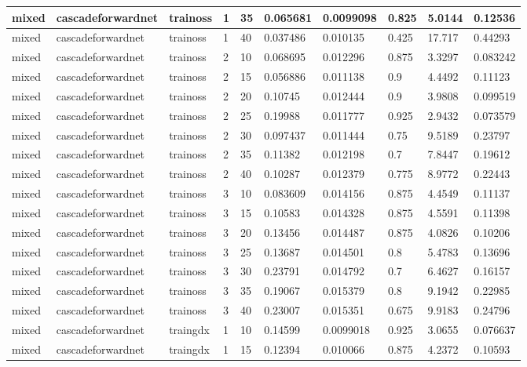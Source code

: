 \begin{longtable}{lllllllll}
mixed & cascadeforwardnet & trainoss & 1 & 35 & 0.065681 & 0.0099098 & 0.825 & 5.0144 & 0.12536 \\ \hline 
mixed & cascadeforwardnet & trainoss & 1 & 40 & 0.037486 & 0.010135 & 0.425 & 17.717 & 0.44293 \\ \hline 
mixed & cascadeforwardnet & trainoss & 2 & 10 & 0.068695 & 0.012296 & 0.875 & 3.3297 & 0.083242 \\ \hline 
mixed & cascadeforwardnet & trainoss & 2 & 15 & 0.056886 & 0.011138 & 0.9 & 4.4492 & 0.11123 \\ \hline 
mixed & cascadeforwardnet & trainoss & 2 & 20 & 0.10745 & 0.012444 & 0.9 & 3.9808 & 0.099519 \\ \hline 
mixed & cascadeforwardnet & trainoss & 2 & 25 & 0.19988 & 0.011777 & 0.925 & 2.9432 & 0.073579 \\ \hline 
mixed & cascadeforwardnet & trainoss & 2 & 30 & 0.097437 & 0.011444 & 0.75 & 9.5189 & 0.23797 \\ \hline 
mixed & cascadeforwardnet & trainoss & 2 & 35 & 0.11382 & 0.012198 & 0.7 & 7.8447 & 0.19612 \\ \hline 
mixed & cascadeforwardnet & trainoss & 2 & 40 & 0.10287 & 0.012379 & 0.775 & 8.9772 & 0.22443 \\ \hline 
mixed & cascadeforwardnet & trainoss & 3 & 10 & 0.083609 & 0.014156 & 0.875 & 4.4549 & 0.11137 \\ \hline 
mixed & cascadeforwardnet & trainoss & 3 & 15 & 0.10583 & 0.014328 & 0.875 & 4.5591 & 0.11398 \\ \hline 
mixed & cascadeforwardnet & trainoss & 3 & 20 & 0.13456 & 0.014487 & 0.875 & 4.0826 & 0.10206 \\ \hline 
mixed & cascadeforwardnet & trainoss & 3 & 25 & 0.13687 & 0.014501 & 0.8 & 5.4783 & 0.13696 \\ \hline 
mixed & cascadeforwardnet & trainoss & 3 & 30 & 0.23791 & 0.014792 & 0.7 & 6.4627 & 0.16157 \\ \hline 
mixed & cascadeforwardnet & trainoss & 3 & 35 & 0.19067 & 0.015379 & 0.8 & 9.1942 & 0.22985 \\ \hline 
mixed & cascadeforwardnet & trainoss & 3 & 40 & 0.23007 & 0.015351 & 0.675 & 9.9183 & 0.24796 \\ \hline 
mixed & cascadeforwardnet & traingdx & 1 & 10 & 0.14599 & 0.0099018 & 0.925 & 3.0655 & 0.076637 \\ \hline 
mixed & cascadeforwardnet & traingdx & 1 & 15 & 0.12394 & 0.010066 & 0.875 & 4.2372 & 0.10593 \\ \hline 

\end{longtable}
